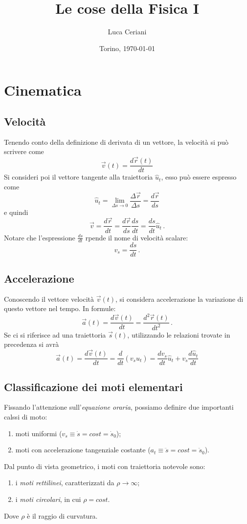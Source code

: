\documentclass[12pt]{book}
\title{\vspace*{\fill}\Huge{\textbf{Le cose della Fisica I}}} %
\author{Luca Ceriani\bigskip}
\date{Torino, \today\vspace*{\fill}}
\begin{document}
\maketitle
\thispagestyle{empty}
\newpage
\chapter{Cinematica}

\section{Velocità}
Tenendo conto della definizione di derivata di un vettore, la velocità si può scrivere come
\[\vec{v}(t)=\frac{d\vec{r}(t)}{dt}\]
Si consideri poi il vettore tangente alla traiettoria $\hat{u}_t$, esso può essere espresso come
\[\hat{u}_t=\lim_{\Delta s\rightarrow 0}\dfrac{\Delta\vec{r}}{\Delta s}
= \frac{d\vec{r}}{ds}\]
e quindi
\[\vec{v}=\frac{d\vec{r}}{dt}=\frac{d\vec{r}}{ds}\frac{ds}{dt}=\frac{ds}{dt}\hat{u}_t\,.\]
Notare che l'espressione $\frac{ds}{dt}$ rpende il nome di velocità scalare:
\[v_s=\frac{ds}{dt}\,.\]

\section{Accelerazione}
Conoscendo il vettore velocità $\vec{v}(t)$, si considera accelerazione la variazione di questo vettore nel tempo. In formule:
\[\vec{a}(t)=\frac{d\vec{v}(t)}{dt}=\frac{d^2 \vec{r}(t)}{dt^2}\,.\]
Se ci si riferisce ad una traiettoria $\vec{s}(t)$, utilizzando le relazioni trovate in precedenza si avrà
\[\vec{a}(t)=\frac{d\vec{v}(t)}{dt}=\frac{d}{dt}(v_s \hat{u}_t)=\frac{dv_s}{dt}\hat{u}_t+v_s\frac{d\hat{u}_t}{dt}\]

\section{Classificazione dei moti elementari}
Fissando l'attenzione sull'\textit{equazione oraria}, possiamo definire due importanti calssi di moto:
\begin{enumerate}
\item moti uniformi ($v_s\equiv \dot{s} = cost = \dot{s}_0$);
\item{moti con accelerazione tangenziale costante ($a_t\equiv \ddot{s} = cost = \ddot{s}_0$).}
\end{enumerate}
Dal punto di vista geometrico, i moti con traiettoria notevole sono:
\begin{enumerate}
\item i \emph{moti rettilinei}, caratterizzati da $\rho \rightarrow \infty$;
\item i \emph{moti circolari}, in cui $\rho = cost$.
\end{enumerate}
Dove $\rho$ è il raggio di curvatura.
\end{document}
